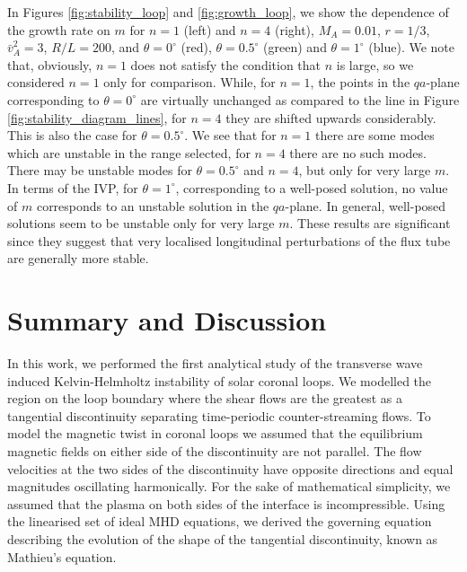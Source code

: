 \documentclass[12pt]{ociamthesis}
\begin{document}
In Figures \ref{fig:stability_loop} and \ref{fig:growth_loop}, we show the dependence of the growth rate on $m$ for $n = 1$ (left) and $n=4$ (right), $M_A = 0.01$, $r = 1/3$, $\bar{v}_A^2 = 3$, $R/L = 200$, and $\theta = 0^\circ$ (red), $\theta = 0.5^\circ$ (green) and $\theta = 1^\circ$ (blue).
We note that, obviously, $n = 1$ does not satisfy the condition that $n$ is large, so we considered $n = 1$ only for comparison.
While, for $n=1$, the points in the $qa$-plane corresponding to $\theta = 0^\circ$ are virtually unchanged as compared to the line in Figure \ref{fig:stability_diagram_lines}, for $n=4$ they are shifted upwards considerably.
This is also the case for $\theta = 0.5^\circ$.
We see that for $n=1$ there are some modes which are unstable in the range selected, for $n=4$ there are no such modes.
There may be unstable modes for $\theta = 0.5^\circ$ and $n=4$, but only for very large $m$.
In terms of the IVP, for $\theta = 1^\circ$, corresponding to a well-posed solution, no value of $m$ corresponds to an unstable solution in the $qa$-plane.
In general, well-posed solutions seem to be unstable only for very large $m$.
These results are significant since they suggest that very localised longitudinal perturbations of the flux tube are generally more stable.

\section{Summary and Discussion}
\label{sec:sum}

In this work, we performed the first analytical study of the transverse wave induced Kelvin-Helmholtz instability of solar coronal loops. We modelled the region on the loop boundary where the shear flows are the greatest as a tangential discontinuity separating time-periodic counter-streaming flows.
To model the magnetic twist in coronal loops we assumed that the equilibrium magnetic fields on either side of the discontinuity are not parallel.
The flow velocities at the two sides of the discontinuity have opposite directions and equal magnitudes oscillating harmonically.
For the sake of mathematical simplicity, we assumed that the plasma on both sides of the interface is incompressible.
Using the linearised set of ideal MHD equations, we derived the governing equation describing the evolution of the shape of the tangential discontinuity, known as Mathieu's equation.
\end{document}
